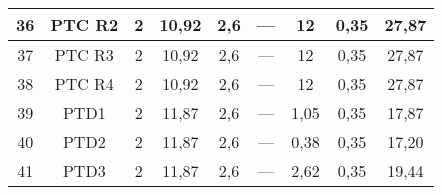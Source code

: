\begin{table}[h!]
\begin{tabular}{|c|c|c|c|c|c|c|c|c|}
	36                 & PTC R2             & 2                                                    & 10,92                                       & 2,6                                           & ---                                           & 12                                               & 0,35                                            & 27,87                                                             \\ \hline
	37                 & PTC R3             & 2                                                    & 10,92                                       & 2,6                                           & ---                                           & 12                                               & 0,35                                            & 27,87                                                             \\ \hline
	38                 & PTC R4             & 2                                                    & 10,92                                       & 2,6                                           & ---                                           & 12                                               & 0,35                                            & 27,87                                                             \\ \hline
	39                 & PTD1               & 2                                                    & 11,87                                       & 2,6                                           & ---                                           & 1,05                                             & 0,35                                            & 17,87                                                             \\ \hline
	40                 & PTD2               & 2                                                    & 11,87                                       & 2,6                                           & ---                                           & 0,38                                             & 0,35                                            & 17,20                                                             \\ \hline
	41                 & PTD3               & 2                                                    & 11,87                                       & 2,6                                           & ---                                           & 2,62                                             & 0,35                                            & 19,44                                                             \\ \hline

\end{tabular}
\end{table}
